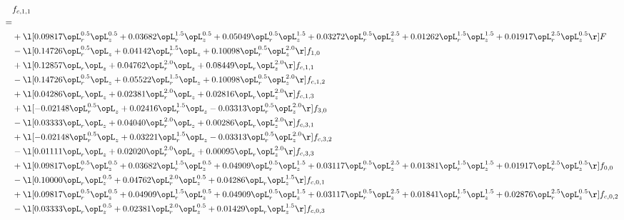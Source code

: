 \begin{alignat}{2} 
\label{eq:f_11_1} 
& f_{c,1,1} \nonumber \\ 
 = \\ 
& + \l[  0.09817 \opL_r^{0.5} \opL_z^{0.5} +  0.03682 \opL_r^{1.5} \opL_z^{0.5} +  0.05049 \opL_r^{0.5} \opL_z^{1.5} +  0.03272 \opL_r^{0.5} \opL_z^{2.5} +  0.01262 \opL_r^{1.5} \opL_z^{1.5} +  0.01917 \opL_r^{2.5} \opL_z^{0.5}  \r] F \nonumber \\ 
& - \l[  0.14726 \opL_r^{0.5} \opL_z +  0.04142 \opL_r^{1.5} \opL_z +  0.10098 \opL_r^{0.5} \opL_z^{2.0}  \r] f_{1,0} \nonumber \\ 
& + \l[  0.12857 \opL_r \opL_z +  0.04762 \opL_r^{2.0} \opL_z +  0.08449 \opL_r \opL_z^{2.0}  \r] f_{c,1,1} \nonumber \\ 
& - \l[  0.14726 \opL_r^{0.5} \opL_z +  0.05522 \opL_r^{1.5} \opL_z +  0.10098 \opL_r^{0.5} \opL_z^{2.0}  \r] f_{c,1,2} \nonumber \\ 
& + \l[  0.04286 \opL_r \opL_z +  0.02381 \opL_r^{2.0} \opL_z +  0.02816 \opL_r \opL_z^{2.0}  \r] f_{c,1,3} \nonumber \\ 
& + \l[  -0.02148 \opL_r^{0.5} \opL_z +  0.02416 \opL_r^{1.5} \opL_z   -0.03313 \opL_r^{0.5} \opL_z^{2.0}  \r] f_{3,0} \nonumber \\ 
& - \l[  0.03333 \opL_r \opL_z +  0.04040 \opL_r^{2.0} \opL_z +  0.00286 \opL_r \opL_z^{2.0}  \r] f_{c,3,1} \nonumber \\ 
& + \l[  -0.02148 \opL_r^{0.5} \opL_z +  0.03221 \opL_r^{1.5} \opL_z   -0.03313 \opL_r^{0.5} \opL_z^{2.0}  \r] f_{c,3,2} \nonumber \\ 
& - \l[  0.01111 \opL_r \opL_z +  0.02020 \opL_r^{2.0} \opL_z +  0.00095 \opL_r \opL_z^{2.0}  \r] f_{c,3,3} \nonumber \\ 
& + \l[  0.09817 \opL_r^{0.5} \opL_z^{0.5} +  0.03682 \opL_r^{1.5} \opL_z^{0.5} +  0.04909 \opL_r^{0.5} \opL_z^{1.5} +  0.03117 \opL_r^{0.5} \opL_z^{2.5} +  0.01381 \opL_r^{1.5} \opL_z^{1.5} +  0.01917 \opL_r^{2.5} \opL_z^{0.5}  \r] f_{0,0} \nonumber \\ 
& - \l[  0.10000 \opL_r \opL_z^{0.5} +  0.04762 \opL_r^{2.0} \opL_z^{0.5} +  0.04286 \opL_r \opL_z^{1.5}  \r] f_{c,0,1} \nonumber \\ 
& + \l[  0.09817 \opL_r^{0.5} \opL_z^{0.5} +  0.04909 \opL_r^{1.5} \opL_z^{0.5} +  0.04909 \opL_r^{0.5} \opL_z^{1.5} +  0.03117 \opL_r^{0.5} \opL_z^{2.5} +  0.01841 \opL_r^{1.5} \opL_z^{1.5} +  0.02876 \opL_r^{2.5} \opL_z^{0.5}  \r] f_{c,0,2} \nonumber \\ 
& - \l[  0.03333 \opL_r \opL_z^{0.5} +  0.02381 \opL_r^{2.0} \opL_z^{0.5} +  0.01429 \opL_r \opL_z^{1.5}  \r] f_{c,0,3} \nonumber \\ 

\end{alignat}
